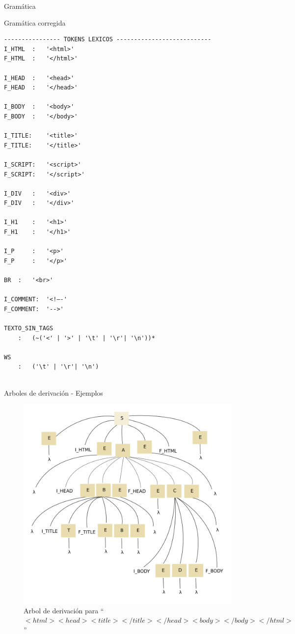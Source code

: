 \documentclass[a4paper,8pt]{article}
\begin{document}
\begin{section}{Gramática}
\begin{subsection}{Gramática corregida}
\begin{verbatim}
---------------- TOKENS LEXICOS ---------------------------
I_HTML 	:	'<html>' 
F_HTML 	:	'</html>' 

I_HEAD 	:	'<head>'  
F_HEAD 	:	'</head>' 

I_BODY 	:	'<body>' 
F_BODY 	:	'</body>'

I_TITLE:	'<title>'  
F_TITLE:	'</title>' 
	
I_SCRIPT:	'<script>'  
F_SCRIPT:	'</script>' 
	
I_DIV 	:	'<div>' 
F_DIV 	:	'</div>' 
	
I_H1 	:	'<h1>'  
F_H1 	:	'</h1>' 
	
I_P 	:	'<p>'
F_P 	:	'</p>' 

BR 	:	'<br>'

I_COMMENT:	'<!–-'
F_COMMENT:	'-->'

TEXTO_SIN_TAGS 
	:	(~('<' | '>' | '\t' | '\r'| '\n'))* 

WS 
    :   ('\t' | '\r'| '\n') 


\end{verbatim}
\bigskip
\newpage
 \begin{subsubsection}{Arboles de derivación - Ejemplos}
       \begin{figure}[h!]
      \centering
      \includegraphics[scale=0.30]{ejemplo1.png}

      \caption{Arbol de derivación para ``$<html><head><title></title></head><body></body></html>$''}
    \end{figure}


\end{subsubsection}
\end{subsection}
\end{section}
\end{document}
